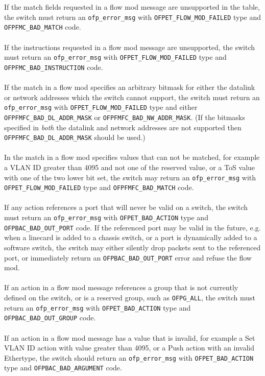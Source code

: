 \documentclass[10pt]{article}
\begin{document}
If the match fields requested in a flow mod message are unsupported in the table, the switch must return an \verb|ofp_error_msg| with \verb|OFPET_FLOW_MOD_FAILED| type and \verb|OFPFMC_BAD_MATCH| code.
\\\\
If the instructions requested in a flow mod message are unsupported, the switch must return an \verb|ofp_error_msg| with \verb|OFPET_FLOW_MOD_FAILED| type and \verb|OFPFMC_BAD_INSTRUCTION| code.
\\\\
If the match in a flow mod specifies an arbitrary bitmask for either the datalink or network addresses which the switch cannot support, the switch must return an \verb|ofp_error_msg| with \verb|OFPET_FLOW_MOD_FAILED| type and either \verb|OFPFMFC_BAD_DL_ADDR_MASK| or \verb|OFPFMFC_BAD_NW_ADDR_MASK|. (If the bitmasks specified in \emph{both} the datalink and network addresses are not supported then \verb|OFPFMFC_BAD_DL_ADDR_MASK| should be used.)
\\\\
In the match in a flow mod specifies values that can not be matched, for example a VLAN ID greater than 4095 and not one of the reserved value, or a ToS value with one of the two lower bit set, the switch may return an \verb|ofp_error_msg| with \verb|OFPET_FLOW_MOD_FAILED| type and \verb|OFPFMFC_BAD_MATCH| code.
\\\\
If any action references a port that will never be valid on a switch, the switch must return an \verb|ofp_error_msg| with \verb|OFPET_BAD_ACTION| type and \verb|OFPBAC_BAD_OUT_PORT| code.  If the referenced port may be valid in the future, e.g. when a linecard is added to a chassis switch, or a port is dynamically added to a software switch, the switch may either silently drop packets sent to the referenced port, or immediately return an \verb|OFPBAC_BAD_OUT_PORT| error and refuse the flow mod.
\\\\
If an action in a flow mod message references a group that is not currently defined on the switch, or is a reserved group, such as \verb|OFPG_ALL|, the switch must return an \verb|ofp_error_msg| with \verb|OFPET_BAD_ACTION| type and \verb|OFPBAC_BAD_OUT_GROUP| code.
\\\\
If an action in a flow mod message has a value that is invalid, for example a Set VLAN ID action with value greater than 4095, or a Push action with an invalid Ethertype, the switch should return an \verb|ofp_error_msg| with \verb|OFPET_BAD_ACTION| type and \verb|OFPBAC_BAD_ARGUMENT| code.
\end{document}
